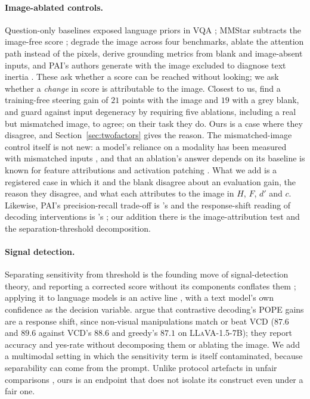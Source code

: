 \documentclass{article} %
\begin{document}
\paragraph{Image-ablated controls.} Question-only baselines exposed language priors in VQA
\citep{goyal2017vqa, agrawal2018vqacp}; MMStar subtracts the image-free score \citep{mmstar};
\citet{lan2026seeing} degrade the image across four benchmarks, \citet{kaduri2025whats} ablate the
attention path instead of the pixels, \citet{zafar2026medical} derive grounding metrics from blank and
image-absent inputs, and PAI's authors generate with the image excluded to diagnose text inertia
\citep{pai}. These ask whether a score can be reached without looking; we ask whether a \emph{change}
in score is attributable to the image. Closest to us, \citet{liao2026decodable} find a training-free
steering gain of $21$ points with the image and $19$ with a grey blank, and guard against input
degeneracy by requiring five ablations, including a real but mismatched image, to agree; on their task
they do. Ours is a case where they disagree, and Section~\ref{sec:twofactors} gives the reason. The mismatched-image control itself is not new: a model's reliance on a modality has been measured
with mismatched inputs \citep{hessel2020emap, gat2021perceptual, parcalabescu2023mmshap}, and that an
ablation's answer depends on its baseline is known for feature attributions
\citep{sturmfels2020baselines} and activation patching \citep{zhang2024patching}. What we add is a
registered case in which it and the blank disagree about an evaluation gain, the reason they disagree,
and what each attributes to the image in $H$, $F$, $d'$ and $c$. Likewise, PAI's precision-recall
trade-off is \citeauthor{sparc}'s \citeyearpar{sparc} and the response-shift reading of decoding
interventions is \citeauthor{mirage}'s \citeyearpar{mirage}; our addition there is the image-attribution
test and the separation-threshold decomposition.

\paragraph{Signal detection.} Separating sensitivity from threshold is the founding move of
signal-detection theory, and reporting a corrected score without its components conflates them
\citep{snodgrass1988, youden1950}; applying it to language models is an active line
\citep{llmsdt2026, llmmetacog2026, machinepsych2026}, with a text model's own confidence as the decision
variable. \citet{mirage} argue that contrastive decoding's POPE gains are a response shift, since
non-visual manipulations match or beat VCD ($87.6$ and $89.6$ against VCD's $88.6$ and greedy's $87.1$ on
\textsc{LLaVA-1.5-7B}); they report accuracy and yes-rate without decomposing them or ablating the image.
We add a multimodal setting in which the sensitivity term is itself contaminated, because separability
can come from the prompt. Unlike protocol artefacts in unfair comparisons \citep{lucic, choi, dacrema,
winnerscurse}, ours is an endpoint that does not isolate its construct even under a fair one.
\end{document}
